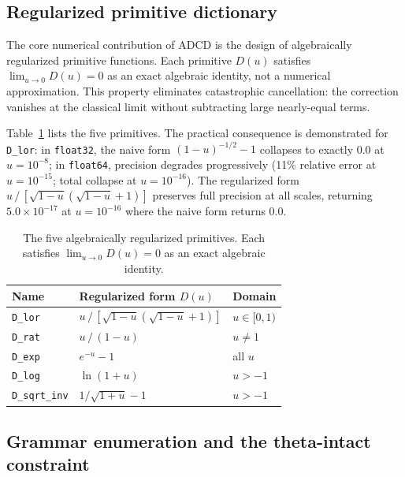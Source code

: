﻿\documentclass{article}
\begin{document}
\subsection{Regularized primitive dictionary}

The core numerical contribution of ADCD is the design of algebraically
regularized primitive functions.
Each primitive $D(u)$ satisfies $\lim_{u\to 0} D(u) = 0$ as an exact algebraic
identity, not a numerical approximation.
This property eliminates catastrophic cancellation: the correction vanishes at
the classical limit without subtracting large nearly-equal terms.

Table~\ref{tab:primitives} lists the five primitives.
The practical consequence is demonstrated for \texttt{D\_lor}: in
\texttt{float32}, the naive form $(1-u)^{-1/2} - 1$ collapses to exactly 0.0
at $u = 10^{-8}$; in \texttt{float64}, precision degrades progressively
(11\% relative error at $u = 10^{-15}$; total collapse at $u = 10^{-16}$).
The regularized form $u\,/\,[\sqrt{1-u}(\sqrt{1-u}+1)]$ preserves full
precision at all scales, returning $5.0 \times 10^{-17}$ at $u = 10^{-16}$
where the naive form returns 0.0.

\begin{table}[ht]
\small
\caption{The five algebraically regularized primitives. Each satisfies
$\lim_{u\to0} D(u) = 0$ as an exact algebraic identity.}
\label{tab:primitives}
\centering
\begin{tabular}{@{}lll@{}}
\toprule
Name & Regularized form $D(u)$ & Domain \\
\midrule
\texttt{D\_lor}      & $u\,/\,[\sqrt{1-u}(\sqrt{1-u}+1)]$ & $u \in [0,1)$ \\
\texttt{D\_rat}      & $u\,/\,(1-u)$                       & $u \neq 1$ \\
\texttt{D\_exp}      & $e^{-u} - 1$                        & all $u$ \\
\texttt{D\_log}      & $\ln(1+u)$                          & $u > -1$ \\
\texttt{D\_sqrt\_inv}& $1/\sqrt{1+u} - 1$                  & $u > -1$ \\
\bottomrule
\end{tabular}
\end{table}

\subsection{Grammar enumeration and the theta-intact constraint}
\end{document}
